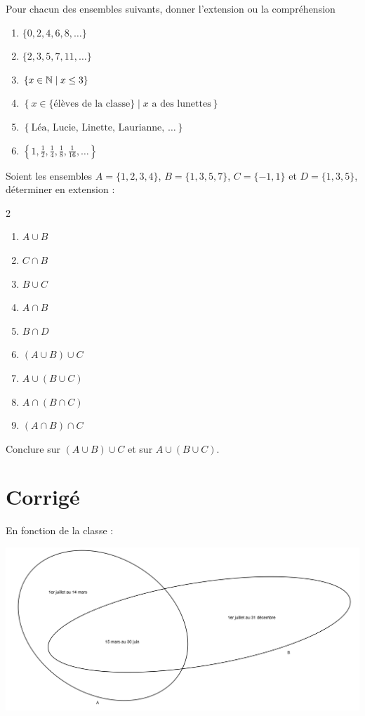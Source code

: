 \begin{exercice}
Pour chacun des ensembles suivants, donner l'extension ou la compréhension
	\begin{enumerate}
	\item
	$
	\{0,2,4,6,8,\dots\}
	$
	\item
	$
	\{2,3,5,7,11,\dots \}
	$
	\item
	$
	\left\{ x\in \mathbb{N} \; | \; x\leq 3\right\}
	$
	\item
	$
	\left\{ x\in \{ \mbox{élèves de la classe} \} \; | \; x \mbox{ a des lunettes} \right\}
	$
	\item
	$
	\left\{ \mbox{Léa, Lucie, Linette, Laurianne, } \dots \right\}
	$
	\item 
	$
	\left\{1, \frac{1}{2}, \frac{1}{4}, \frac{1}{8}, \frac{1}{16}, \dots \right\}
	$
	\end{enumerate}
\end{exercice}

\begin{exercice}
Soient les ensembles $A=\{1,2,3,4\}$, $B=\{1,3,5,7\}$, $C= \{-1,1\}$ et $D = \{1,3,5\}$, déterminer en extension :
\begin{multicols}2
	\begin{enumerate}
	\item $ A\cup B$
	\item $ C \cap B $
	\item $ B \cup C $
	\item $ A \cap B $
	\item $ B \cap D $
	\item $ (A\cup B)\cup C $
	\item $ A \cup (B\cup C)$
	\item $ A \cap (B\cap C)$
	\item $ (A \cap B) \cap C $
	\end{enumerate}
\end{multicols}
Conclure sur $ (A\cup B)\cup C $ et sur $ A \cup (B \cup C) $.
\end{exercice}
\newpage
\section{Corrigé}
\begin{solution}En fonction de la classe :
\begin{center}
\includegraphics[width = \textwidth]{ensemble/ex1.png}
\end{center}
\end{solution}

